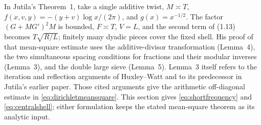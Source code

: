 In Jutila's Theorem~1, take a single additive twist, $M\asymp T$,
$f(x,v,y)=-(y+v)\log x/(2\pi)$, and $g(x)=x^{-1/2}$.
The factor $(G+MG')^2M$ is bounded, $F\asymp T$, $V=L$, and the
second term of (1.13) becomes $T\sqrt{R/L}$; finitely many dyadic
pieces cover the fixed shell. His proof of that mean-square estimate
uses the additive-divisor transformation (Lemma~4), the two simultaneous
spacing conditions for fractions and their modular inverses (Lemma~3),
and the double large sieve (Lemma~5). Lemma~3 itself refers to the
iteration and reflection arguments of Huxley--Watt and to its
predecessor in Jutila's earlier paper. Those cited arguments give
the arithmetic off-diagonal estimate in \eqref{eq:dirichletmeansquare}.
This section gives \eqref{eq:shortfrequency} and
\eqref{eq:centralshell}; either formulation keeps the stated
mean-square theorem as its analytic input.
